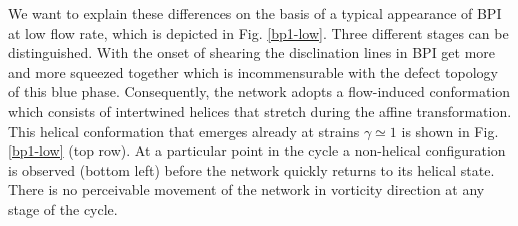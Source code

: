 \documentclass[aps,pre,reprint,superscriptaddress, twocolumn]{revtex4}
\begin{document}
We want to explain these differences on the basis of a typical 
appearance of BPI at low flow rate, which is depicted in Fig. \ref{bp1-low}.
Three different stages can be distinguished. 
With the onset of shearing the disclination lines 
in BPI get more and more squeezed together which is incommensurable with 
the defect topology of this blue phase. 
Consequently, the network adopts a flow-induced conformation which consists 
of intertwined helices that stretch during the affine transformation.
This helical conformation that emerges already at strains $\gamma\simeq1$ 
is shown in Fig. \ref{bp1-low} (top row).
At a particular point in the cycle a non-helical configuration is
observed (bottom left) before the network quickly returns
to its helical state.
There is no perceivable movement of the network in vorticity 
direction at any stage of the cycle.
\end{document}
